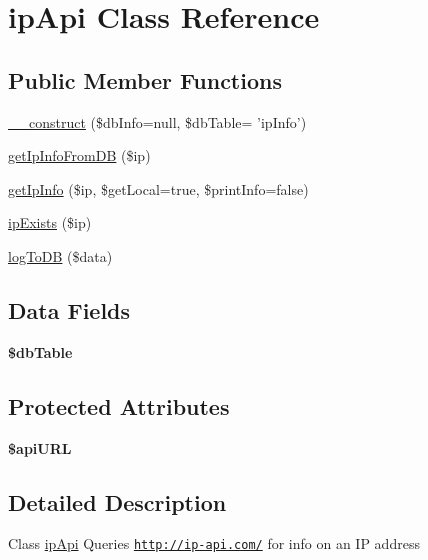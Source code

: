 \hypertarget{classip_api}{\section{ip\-Api Class Reference}
\label{classip_api}
}
\subsection*{Public Member Functions}
\begin{DoxyCompactItemize}
\item 
\hyperlink{classip_api_a68c955b7f95b2bae74fe11c3b1347be5}{\-\_\-\-\_\-construct} (\$db\-Info=null, \$db\-Table= 'ip\-Info')
\item 
\hyperlink{classip_api_a649701a5d2cd6760b96955b3929575ca}{get\-Ip\-Info\-From\-D\-B} (\$ip)
\item 
\hyperlink{classip_api_a686b062a4ea72799099b8151970829de}{get\-Ip\-Info} (\$ip, \$get\-Local=true, \$print\-Info=false)
\item 
\hyperlink{classip_api_a9826f5ea66ee734dc7235094c0833c68}{ip\-Exists} (\$ip)
\item 
\hyperlink{classip_api_a57a840fd314080f4b67086edbfdb995a}{log\-To\-D\-B} (\$data)
\end{DoxyCompactItemize}
\subsection*{Data Fields}
\begin{DoxyCompactItemize}
\item 
\hypertarget{classip_api_adfd23e5286c56c7632ecb55887dd2555}{{\bfseries \$db\-Table}}\label{classip_api_adfd23e5286c56c7632ecb55887dd2555}

\end{DoxyCompactItemize}
\subsection*{Protected Attributes}
\begin{DoxyCompactItemize}
\item 
\hypertarget{classip_api_ae55a59ebe41af641d66d9cfd81cf959f}{{\bfseries \$api\-U\-R\-L}}\label{classip_api_ae55a59ebe41af641d66d9cfd81cf959f}

\end{DoxyCompactItemize}


\subsection{Detailed Description}
Class \hyperlink{classip_api}{ip\-Api} Queries \href{http://ip-api.com/}{\tt http\-://ip-\/api.\-com/} for info on an I\-P address 

